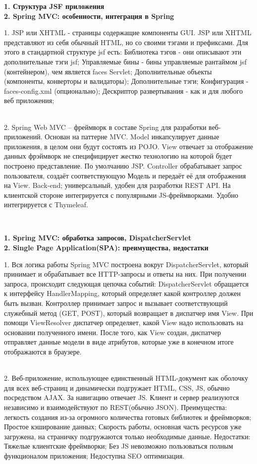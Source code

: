 \documentclass{article}
\newcommand{\bil}[4]{%
    \begin{minipage}{.3\textwidth}
        \textbf{1. #1} \\
        \textbf{2. #2}

        1. #3
        \\
        2. #4
    \end{minipage}
}
\begin{document}
\hfill
\bil{Структура JSF приложения}{Spring MVC: особенности, интеграция в Spring}{
    JSP или XHTML - страницы содержащие компоненты GUI. JSP или XHTML представляют из себя обычный HTML, но со своими тэгами и префиксами.
Для этого в стандартной структуре jsf есть:
Библиотека тэгов - они описывают эти дополнительные тэги jsf;
Управляемые бины - бины управляемые рантаймом jsf (контейнером), чем является faces Servlet;
Дополнительные объекты (компоненты, конверторы и валидаторы);
Дополнительные тэги;
Конфигурация - faces-config.xml (опционально);
Дескриптор развертывания - как и для любого веб приложения;
}{
    Spring Web MVC – фреймворк в составе Spring для разработки веб-приложений.
    Основан на паттерне MVC.
    Model инкапсулирует данные приложения, в целом они будут состоять из POJO.
    View отвечает за отображение данных фрэймворк не специфицирует жестко технологию на которой будет построено представление. По умолчанию JSP.
    Controller обрабатывает запрос пользователя, создаёт соответствующую Модель и передаёт её для отображения на View.
Back-end; универсальный, удобен для разработки REST API. На клиентской стороне интегрируется с популярными JS-фреймворками.
Удобно интегрируется с Thymeleaf.

}
\\
\bil{Spring MVC: обработка запросов, DispatcherServlet}{Single Page Application(SPA): преимущества, недостатки}{
    Вся логика работы Spring MVC построена вокруг DispatcherServlet, который принимает и обрабатывает все HTTP-запросы и ответы на них. При получении запроса, происходит следующая цепочка событий: 
    DispatcherServlet обращается к интерфейсу HandlerMapping, который определяет какой контроллер должен быть вызван. 
    Контроллер принимает запрос и вызывает соответствующий служебный метод (GET, POST), который возвращает в диспатчер имя View.
    При помощи ViewResolver диспатчер определяет, какой View надо использовать на основании полученного имени.
    После того, как View создан, диспатчер отправляет данные модели в виде атрибутов, которые уже в конечном итоге отображаются в браузере.
}{
    Веб-приложение, использующее единственный HTML-документ как оболочку для всех веб-страниц и динамически подгружает HTML, CSS, JS, обычно посредством AJAX. За навигацию отвечает JS.
    Клиент и сервер реализуются независимо и взаимодействуют по REST(обычно JSON). 
    Преимущества: легкость создания из-за огромного количества готовых библиотек и фреймворков;
    Простое кэширование данных;
    Скорость работы, основная часть ресурсов уже загружена, на страничку подгружаются только необходимые данные.
    Недостатки: 
    Тяжелые клиентские фреймворки;
    Без JS невозможно пользоваться полным функционалом приложения;
    Недоступна SEO оптимизация.
}
\end{document}
